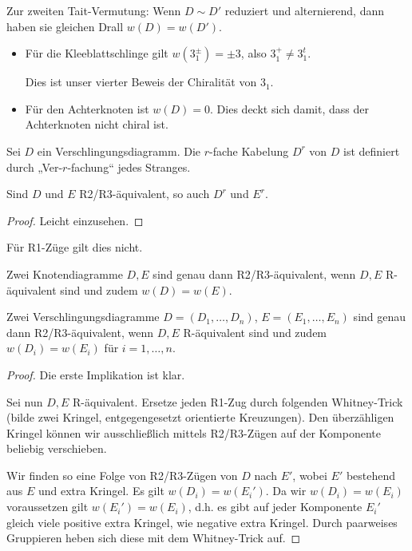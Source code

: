 Zur zweiten Tait-Vermutung:
Wenn $D \sim D'$ reduziert und alternierend, dann haben sie gleichen Drall $w(D) = w(D')$.

\begin{ex}
    \begin{itemize}
        \item
            Für die Kleeblattschlinge gilt $w(3_1^\pm) = \pm 3$, also $3_1^+ \neq 3_1^t$.

            Dies ist unser vierter Beweis der Chiralität von $3_1$.
        \item
            Für den Achterknoten ist $w(D) = 0$.
            Dies deckt sich damit, dass der Achterknoten nicht chiral ist.
    \end{itemize}
\end{ex}

\begin{df}
    Sei $D$ ein Verschlingungsdiagramm.
    Die $r$-fache Kabelung $D^r$ von $D$ ist definiert durch „Ver-$r$-fachung“ jedes Stranges.
\end{df}

\begin{lem}
    Sind $D$ und $E$ R2/R3-äquivalent, so auch $D^r$ und $E^r$.
    \begin{proof}
        Leicht einzusehen.
    \end{proof}
    \begin{note}
        Für R1-Züge gilt dies nicht.
    \end{note}
\end{lem}

\begin{lem}
    Zwei Knotendiagramme $D, E$ sind genau dann R2/R3-äquivalent, wenn $D, E$ R-äquivalent sind und zudem $w(D) = w(E)$.

    Zwei Verschlingungsdiagramme $D = (D_1, \dotsc, D_n)$, $E = (E_1, \dotsc, E_n)$ sind genau dann R2/R3-äquivalent, wenn $D, E$ R-äquivalent sind und zudem $w(D_i) = w(E_i)$ für $i = 1, \dotsc, n$.
    \begin{proof} %
        Die erste Implikation ist klar.

        Sei nun $D, E$ R-äquivalent.
        Ersetze jeden R1-Zug durch folgenden Whitney-Trick (bilde zwei Kringel, entgegengesetzt orientierte Kreuzungen).
        Den überzähligen Kringel können wir ausschließlich mittels R2/R3-Zügen auf der Komponente beliebig verschieben.

        Wir finden so eine Folge von R2/R3-Zügen von $D$ nach $E'$, wobei $E'$ bestehend aus $E$ und extra Kringel.
        Es gilt $w(D_i) = w(E_i')$.
        Da wir $w(D_i) = w(E_i)$ voraussetzen gilt $w(E_i') = w(E_i)$, d.h. es gibt auf jeder Komponente $E_i'$ gleich viele positive extra Kringel, wie negative extra Kringel.
        Durch paarweises Gruppieren heben sich diese mit dem Whitney-Trick auf.
    \end{proof}
\end{lem}

